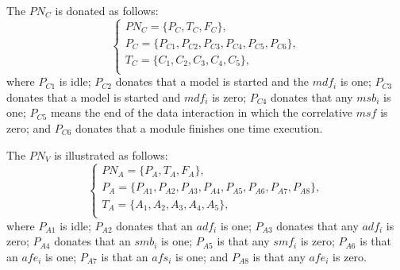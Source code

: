 \documentclass[journal,UTF8]{IEEEtran}
\begin{document}
The $PN_C$ is donated as follows:
\begin{equation}
\left\{
\begin{array}{l}
PN_C= \{P_C,T_C,F_C\},\\
P_C=\{P_{C1}, P_{C2}, P_{C3}, P_{C4}, P_{C5}, P_{C6}\},\\
T_C=\{C_1,C_2,C_3,C_4,C_5\},\\
\end{array}
\right.
\end{equation} 
where $P_{C1}$ is idle; $P_{C2}$ donates that a model is started and the $mdf_i$ is one; $P_{C3}$ donates that a model is started and $mdf_i$ is zero; $P_{C4}$ donates that any $msb_i$ is one; $P_{C5}$ means the end of the data interaction in which the  correlative $msf$ is zero; and $P_{C6}$ donates that a module finishes one time execution.

The $PN_V$ is illustrated as follows:
\begin{equation}
\left\{
\begin{array}{l}
PN_A= \{P_A,T_A,F_A\},\\
P_A=\{P_{A1}, P_{A2}, P_{A3}, P_{A4}, P_{A5}, P_{A6}, P_{A7}, P_{A8}\},\\
T_A=\{A_1,A_2,A_3,A_4,A_5\},\\
\end{array}
\right.
\end{equation} 
where $P_{A1}$ is idle; $P_{A2}$ donates that an $adf_i$ is one; $P_{A3}$ donates that any $adf_i$ is zero; $P_{A4}$ donates that an $smb_i$ is one; $P_{A5}$ is that any $smf_i$ is zero; $P_{A6}$ is that an $afe_i$ is one; $P_{A7}$ is that an $afs_i$ is one; and $P_{A8}$ is that any $afe_i$ is zero.   
\end{document}
